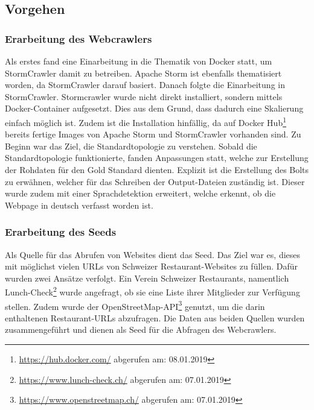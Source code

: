 \subsection{Vorgehen}
\subsubsection{Erarbeitung des Webcrawlers}
Als erstes fand eine Einarbeitung in die Thematik von Docker statt, um StormCrawler damit zu betreiben.
Apache Storm ist ebenfalls thematisiert worden, da StormCrawler darauf basiert.
Danach folgte die Einarbeitung in StormCrawler.
Stormcrawler wurde nicht direkt installiert, sondern mittels Docker-Container aufgesetzt.
Dies aus dem Grund, dass dadurch eine Skalierung einfach möglich ist.
Zudem ist die Installation hinfällig, da auf Docker Hub\footnote{\url{https://hub.docker.com/} abgerufen am: 08.01.2019} bereits fertige Images von Apache Storm und StormCrawler vorhanden sind.
Zu Beginn war das Ziel, die Standardtopologie zu verstehen.
Sobald die Standardtopologie funktionierte, fanden Anpassungen statt, welche zur Erstellung der Rohdaten für den Gold Standard dienten.
Explizit ist die Erstellung des Bolts zu erwähnen, welcher für das Schreiben der Output-Dateien zuständig ist.
Dieser wurde zudem mit einer Sprachdetektion erweitert, welche erkennt, ob die Webpage in deutsch verfasst worden ist.
\subsubsection{Erarbeitung des Seeds}
Als Quelle für das Abrufen von Websites dient das Seed.
Das Ziel war es, dieses mit möglichst vielen URLs von Schweizer Restaurant-Websites zu füllen.
Dafür wurden zwei Ansätze verfolgt.
Ein Verein Schweizer Restaurants, namentlich Lunch-Check\footnote{\url{https://www.lunch-check.ch/} abgerufen am: 07.01.2019} wurde angefragt, ob sie eine Liste ihrer Mitglieder zur Verfügung stellen.
Zudem wurde der OpenStreetMap-API\footnote{\url{https://www.openstreetmap.ch/} abgerufen am: 07.01.2019} genutzt, um die darin enthaltenen Restaurant-URLs abzufragen.
Die Daten aus beiden Quellen wurden zusammengeführt und dienen als Seed für die Abfragen des Webcrawlers.
